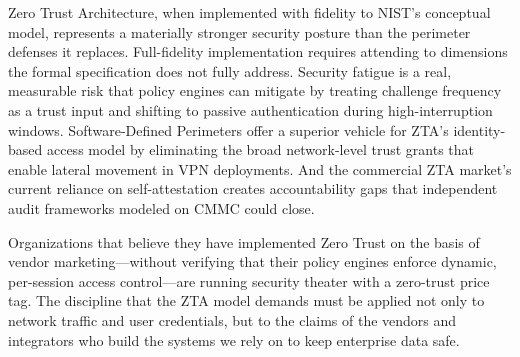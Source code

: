 \documentclass[sigconf,nonacm]{acmart}
\begin{document}
Zero Trust Architecture, when implemented with fidelity to NIST's conceptual
model, represents a materially stronger security posture than the perimeter
defenses it replaces. Full-fidelity implementation requires attending to
dimensions the formal specification does not fully address. Security fatigue
is a real, measurable risk that policy engines can mitigate by treating challenge
frequency as a trust input and shifting to passive authentication during
high-interruption windows. Software-Defined Perimeters offer a superior vehicle
for ZTA's identity-based access model by eliminating the broad network-level trust
grants that enable lateral movement in VPN deployments. And the commercial ZTA
market's current reliance on self-attestation creates accountability gaps that
independent audit frameworks modeled on CMMC could close.

Organizations that believe they have implemented Zero Trust on the basis of vendor
marketing---without verifying that their policy engines enforce dynamic, per-session
access control---are running security theater with a zero-trust price tag. The
discipline that the ZTA model demands must be applied not only to network traffic
and user credentials, but to the claims of the vendors and integrators who build
the systems we rely on to keep enterprise data safe.
\end{document}
